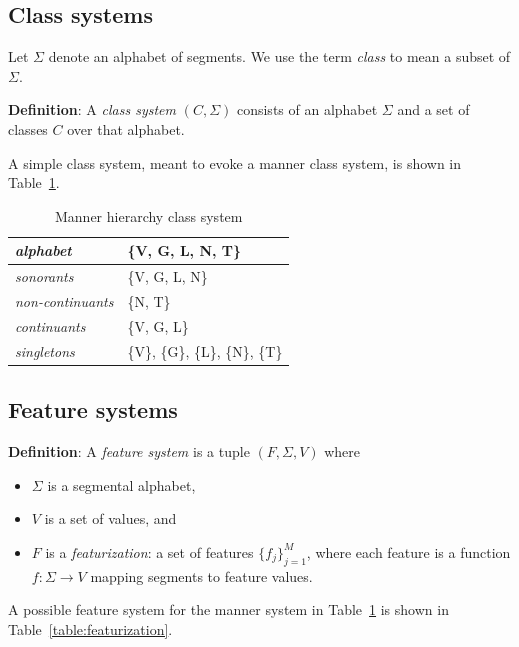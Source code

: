 \documentclass[12pt, oneside]{article}   	%
\begin{document}
\subsection{Class systems}

Let $\Sigma$ denote an alphabet of segments. We use the term \textit{class} to mean a subset of $\Sigma$. 

\vspace{0.5\baselineskip} \noindent \textbf{Definition}: A \textit{class system} $(C, \Sigma)$ consists of an alphabet $\Sigma$ and a set of classes $C$ over that alphabet. 

\vspace{0.5\baselineskip}  \noindent A simple class system, meant to evoke a manner class system, is shown in Table~\ref{table:manner_system}.

\begin{table}[htb!]
	\centering
	\begin{tabular}{|l|l|}
		\hline
		\textit{alphabet} & \{V, G, L, N, T\} \\
		\hline
		\textit{sonorants} & \{V, G, L, N\} \\
		\hline
		\textit{non-continuants} & \{N, T\} \\
		\hline
		\textit{continuants} & \{V, G, L\} \\
		\hline
		\textit{singletons} & \{V\}, \{G\}, \{L\}, \{N\}, \{T\} \\
		\hline
	\end{tabular}
	\caption{Manner hierarchy class system}
	\label{table:manner_system}
\end{table}

\subsection{Feature systems}

\textbf{Definition}: A \textit{feature system} is a tuple $(F, \Sigma, V)$ where
\begin{itemize}
    \item $\Sigma$ is a segmental alphabet, 
    \item $V$ is a set of values, and 
    \item $F$ is a \textit{featurization}: a set of features $\{f_j\}_{j=1}^M$, where each feature is a function $f: \Sigma \rightarrow V$ mapping segments to feature values.
\end{itemize}
A possible feature system for the manner system in Table~\ref{table:manner_system} is shown in Table~\ref{table:featurization}.
\end{document}
